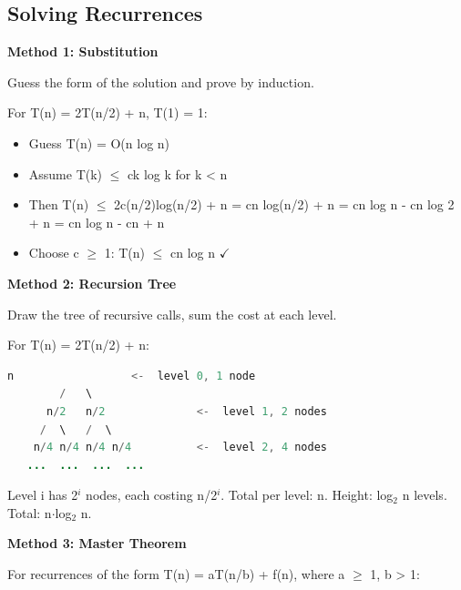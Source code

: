 \subsection{Solving Recurrences}

\textbf{Method 1: Substitution}

Guess the form of the solution and prove by induction.

For T(n) = 2T(n/2) + n, T(1) = 1:
\begin{itemize}
\item Guess T(n) = O(n log n)
\item Assume T(k) $\le $ ck log k for k < n
\item Then T(n) $\le $ 2c(n/2)log(n/2) + n = cn log(n/2) + n = cn log n - cn log 2 + n = cn log n - cn + n
\item Choose c $\ge $ 1: T(n) $\le $ cn log n $\checkmark$
\end{itemize}

\textbf{Method 2: Recursion Tree}

Draw the tree of recursive calls, sum the cost at each level.

For T(n) = 2T(n/2) + n:
\begin{lstlisting}[language=Java]
          n                  <-  level 0, 1 node
        /   \
      n/2   n/2              <-  level 1, 2 nodes
     /  \   /  \
    n/4 n/4 n/4 n/4          <-  level 2, 4 nodes
   ...  ...  ...  ...
\end{lstlisting}
Level i has 2$^{i}$ nodes, each costing n/2$^{i}$. Total per level: n.
Height: log$_{2}$ n levels. Total: n$\cdot $log$_{2}$ n.

\textbf{Method 3: Master Theorem}

For recurrences of the form T(n) = aT(n/b) + f(n), where a $\ge $ 1, b > 1:

